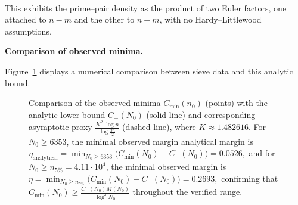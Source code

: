 \documentclass[11pt]{article}
\makeatletter
\theoremstyle{inline}
\theoremstyle{break}
\renewenvironment{proof}[1][\proofname]{%
  \par\pushQED{\qed}%
  \normalfont \topsep6\p@\@plus6\p@\relax
  \trivlist
  \item[\hskip\labelsep
        \itshape
    #1\@addpunct{.}]\mbox{}\\  %
}{%
  \popQED\endtrivlist\@endpefalse
}
\theoremstyle{break}
\theoremstyle{break}
\theoremstyle{break}
\theoremstyle{break}
\theoremstyle{break}
\theoremstyle{break}
\theoremstyle{inline}
\newcommand{\xMertens}{6353} %
\newcommand{\xNzeroStat}{71633} %
\newcommand{\xEtaStat}{0.2693} %
\newcommand{\xMinGlobal}{7219}       %
\newcommand{\xDeltaGlobal}{0.0526}   %
\newcommand{\tana}{{\scriptscriptstyle\mathrm{analytical}}}
\newcommand{\Cmeas}{C}              %
\newcommand{\Cminus}{\mathring{C}_{-}}   %
\newcommand{\CminusProduct}{C_{-}}
\newcommand{\CminusAsymp}{C_{-}^{\mathrm{asymp}}}
\makeatother
\begin{document}
\begin{proof}
This exhibits the prime--pair density as the product of two Euler factors,
one attached to \(n-m\) and the other to \(n+m\), with no Hardy--Littlewood
assumptions.\cite{HardyLittlewood1923,Vaughan1997} 

\noindent\textbf{Comparison of observed minima.}

Figure~\ref{fig:lower-analytic-bound-comparison} displays
a numerical comparison between sieve data and this analytic bound.

\cpsdata

\begin{figure}[H]
\centering
{}
\caption{Comparison of the observed minima \( \Cmeas_{\min}(n_0) \) (points) with the analytic lower bound \( \CminusProduct(N_0) \) (solid line)
and corresponding asymptotic proxy \( \tfrac{K^2\;\log{n}}{\log{\frac{3n}{2}}} \) (dashed line), where \( K \approx 1.482616 \).
For \( N_0 \ge \xMertens \), the minimal observed margin analytical margin is
\(\displaystyle 
\eta_{\tana} = \min_{N_0 \ge \xMertens} \bigl( \Cmeas_{\min}(N_0) - \CminusProduct(N_0) ) = \xDeltaGlobal,
\)
and for \( N_0 \ge n_{5\%} = 4.11 \cdot 10^{4} \), the minimal observed margin is
\(\displaystyle 
\eta = \min_{N_0 \ge n_{5\%}} \bigl( \Cmeas_{\min}(N_0) - \CminusProduct(N_0) ) = \xEtaStat,
\)
confirming that \( \Cmeas_{\min}(N_0) \ge \tfrac{\CminusProduct(N_0) M(N_0)}{\log^2{N_0}} \) throughout the verified range.}
\label{fig:lower-analytic-bound-comparison}
\end{figure}



\end{proof}
\end{document}
